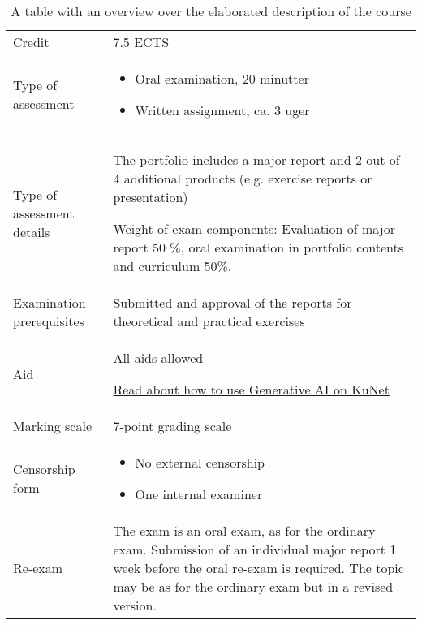\begin{table}[h]
    \centering
    \caption{A table with an overview over the elaborated description of the course}
    \label{tab:elaborated_description}
    \begin{tabular}{ l | p{10cm} }
        Credit & 7.5 ECTS \\ 
        
        Type of assessment & \begin{itemize}
                                \item Oral examination, 20 minutter
                                \item Written assignment, ca. 3 uger
                            \end{itemize} \\ 

        Type of assessment details & The portfolio includes a major report and 2 out of 4 additional products (e.g. exercise reports or presentation)

        Weight of exam components: Evaluation of major report 50 \%, oral examination in portfolio contents and curriculum 50\%. \\

        Examination prerequisites & Submitted and approval of the reports for theoretical and practical exercises \\ 

        Aid & All aids allowed 

        \href{https://kunet.ku.dk/study/food-science-technology-ma/Pages/topic.aspx?topicid=20fc0507-633c-455d-85ae-eb53a44d4072}{Read about how to use Generative AI on KuNet}\\

        Marking scale & 7-point grading scale \\

        Censorship form &   \begin{itemize}
                                \item No external censorship
                                \item One internal examiner
                            \end{itemize} \\

        Re-exam &   The exam is an oral exam, as for the ordinary exam. Submission of an individual major report 1 week before the oral re-exam is required. The topic may be as for the ordinary exam but in a revised version. \\ 
    \end{tabular}
\end{table}


\newpage